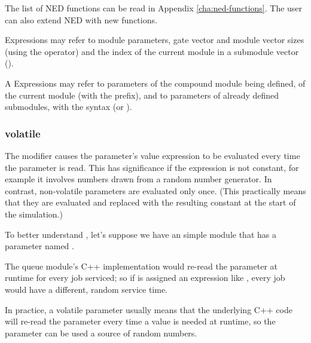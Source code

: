 \begin{note}
    The list of NED functions can be read in Appendix \ref{cha:ned-functions}.
    The user can also extend NED with new functions.
\end{note}


Expressions may refer to module parameters, gate vector and module vector sizes
(using the  operator) and the index of the current module
in a submodule vector ().


A Expressions may refer to parameters of the compound module being defined,
of the current module (with the  prefix), and to parameters
of already defined submodules, with the syntax 
(or ).




\subsubsection{volatile}

The  modifier causes the parameter's value expression to
be evaluated every time the parameter is read. This has significance if the
expression is not constant, for example it involves numbers drawn from a
random number generator. In contrast, non-volatile parameters are evaluated
only once. (This practically means that they are evaluated and replaced
with the resulting constant at the start of the simulation.)

To better understand , let's suppose we have an
 simple module that has a  parameter
named .

The queue module's C++ implementation would re-read the 
parameter at runtime for every job serviced; so if  is
assigned an expression like , every job would have
a different, random service time.

In practice, a volatile parameter usually means that the underlying C++
code will re-read the parameter every time a value is needed at runtime, so
the parameter can be used a source of random numbers.

